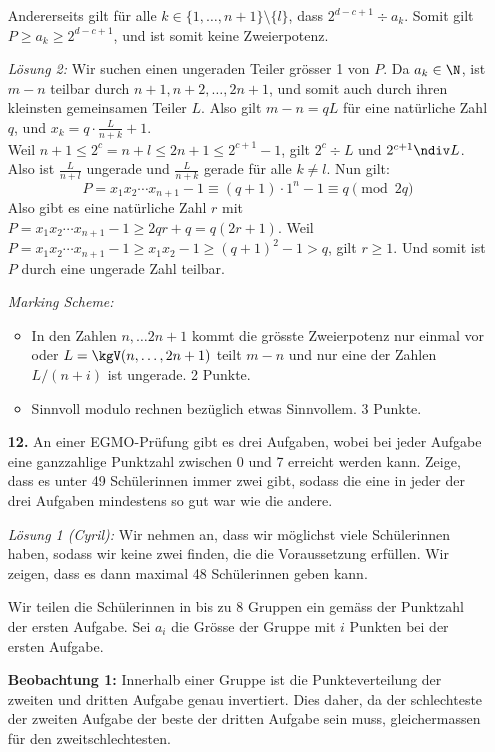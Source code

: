 \documentclass[language=german,style=solution]{smo}
\begin{document}
\begin{enumerate}
Andererseits gilt für alle $k\in \{1,\ldots,n+1\}\setminus\{l\}$, dass  $2^{d-c+1}\div a_k$. Somit gilt $P\geq a_k\geq2^{d-c+1}$, und ist somit keine Zweierpotenz. 

\textit{Lösung 2:}
Wir suchen einen ungeraden Teiler grösser 1 von $P$. Da $a_k\in \N$, ist $m-n$ teilbar durch $n+1, n+2, \ldots, 2n+1$, und somit auch durch ihren kleinsten gemeinsamen Teiler $L$. Also gilt $m-n=qL$ für eine natürliche Zahl $q$, und $x_k=q\cdot\frac{L}{n+k}+1$.\\
Weil $n+1\leq 2^c=n+l\leq2n+1\leq2^{c+1}-1$, gilt $2^c\div L$ und $2^{c+1}\ndiv L$. Also ist $\frac{L}{n+l}$ ungerade und $\frac{L}{n+k}$ gerade für alle $k\neq l$. Nun gilt:
\[
P=x_1x_2\cdots x_{n+1}-1\equiv(q+1)\cdot1^n-1\equiv q \pmod{2q}
\]
Also gibt es eine natürliche Zahl $r$ mit $P=x_1x_2\cdots x_{n+1}-1\geq2qr+q=q(2r+1)$.
Weil $P=x_1x_2\cdots x_{n+1}-1\geq x_1x_2-1\geq(q+1)^2-1>q$, gilt $r\geq1$. Und somit ist $P$ durch eine ungerade Zahl teilbar.

\textit{Marking Scheme:}
\begin{itemize}
	\item In den Zahlen $n,\ldots 2n+1$ kommt die grösste Zweierpotenz nur einmal vor oder $L=\kgV(n,\ldots,2n+1)$ teilt $m-n$ und nur eine der Zahlen $L/(n+i)$ ist ungerade. 2 Punkte.
	\item Sinnvoll modulo rechnen bezüglich etwas Sinnvollem. 3 Punkte.
\end{itemize}


\newpage

\item[\textbf{12.}] %
An einer EGMO-Prüfung gibt es drei Aufgaben, wobei bei jeder Aufgabe eine ganzzahlige Punkt\-zahl zwischen 0 und 7 erreicht werden kann. Zeige, dass es unter 49 Schülerinnen immer zwei gibt, sodass die eine in jeder der drei Aufgaben mindestens so gut war wie die andere.

\textit{Lösung 1 (Cyril):}
Wir nehmen an, dass wir möglichst viele Schülerinnen haben, sodass wir keine zwei finden, die die Voraussetzung erfüllen. Wir zeigen, dass es dann maximal 48 Schülerinnen geben kann.

Wir teilen die Schülerinnen in bis zu 8 Gruppen ein gemäss der Punktzahl der ersten Aufgabe. Sei $a_i$ die Grösse der Gruppe mit $i$ Punkten bei der ersten Aufgabe.

\textbf{Beobachtung 1:} Innerhalb einer Gruppe ist die Punkteverteilung der zweiten und dritten Aufgabe genau invertiert. Dies daher, da der schlechteste der zweiten Aufgabe der beste der dritten Aufgabe sein muss, gleichermassen für den zweitschlechtesten.


\end{enumerate}
\end{document}
